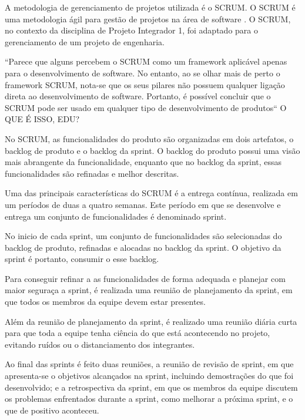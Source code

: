 A metodologia de gerenciamento de projetos utilizada é o SCRUM. O SCRUM é uma metodologia ágil para gestão de projetos na área de software \cite{devagil}. O SCRUM, no contexto da disciplina de Projeto Integrador 1, foi adaptado para o gerenciamento de um projeto de engenharia.

“Parece que alguns percebem o SCRUM como um framework aplicável apenas para o desenvolvimento de software. No entanto, ao se olhar mais de perto o framework SCRUM, nota-se que os seus pilares não possuem qualquer ligação direta ao desenvolvimento de software. Portanto, é possível concluir que o SCRUM pode ser usado em qualquer tipo de desenvolvimento de produtos“ \cite{scrumineng} O QUE É ISSO, EDU?

No SCRUM, as funcionalidades do produto são organizadas em dois artefatos, o backlog de produto e o backlog da sprint. O backlog do produto possui uma visão mais abrangente da funcionalidade, enquanto que no backlog da sprint, essas funcionalidades são refinadas e melhor descritas.

Uma das principais características do SCRUM é a entrega contínua, realizada em um períodos de duas a quatro semanas. Este período em que se desenvolve e entrega um conjunto de funcionalidades é denominado sprint.

No inicio de cada sprint, um conjunto de funcionalidades são selecionadas do backlog de produto, refinadas e alocadas no backlog da sprint. O objetivo da sprint é portanto, consumir o esse backlog.

Para conseguir refinar a as funcionalidades de forma adequada e planejar com maior seguraça a sprint, é realizada uma reunião de planejamento da sprint, em que todos os membros da equipe devem estar presentes.

Além da reunião de planejamento da sprint, é realizado uma reunião diária curta para que toda a equipe tenha ciência do que está acontecendo no projeto, evitando ruídos ou o distanciamento dos integrantes.

Ao final das sprints é feito duas reuniões, a reunião de revisão de sprint, em que apresenta-se o objetivos alcançados na sprint, incluindo demostrações do que foi desenvolvido; e a retrospectiva da sprint, em que os membros da equipe discutem os problemas enfrentados durante a sprint, como melhorar a próxima sprint, e o que de positivo aconteceu.
